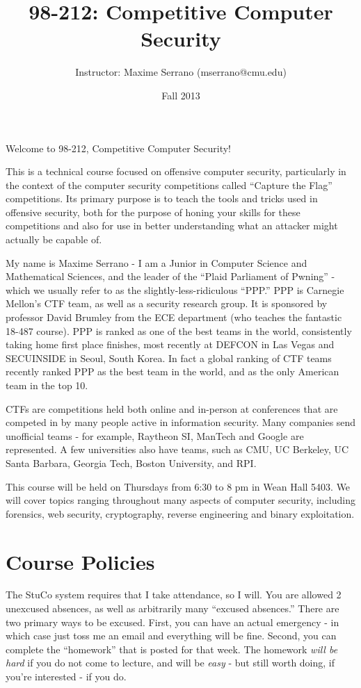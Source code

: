 \documentclass{article}
\title{98-212: Competitive Computer Security}
\date{Fall 2013}
\author{Instructor: Maxime Serrano (mserrano@cmu.edu)}
\begin{document}
\maketitle
Welcome to 98-212, Competitive Computer Security!

This is a technical course focused on offensive computer security, particularly in the context
of the computer security competitions called ``Capture the Flag'' competitions. Its primary purpose
is to teach the tools and tricks used in offensive security, both for the purpose of honing your
skills for these competitions and also for use in better understanding what an attacker might
actually be capable of.

My name is Maxime Serrano - I am a Junior in Computer Science and Mathematical Sciences, and the 
leader of the ``Plaid Parliament of Pwning'' - which we usually refer to as the slightly-less-ridiculous
``PPP.'' PPP is Carnegie Mellon's CTF team, as well as a security research group. It is sponsored by 
professor David Brumley from the ECE department (who teaches the fantastic 18-487 course). PPP is ranked
as one of the best teams in the world, consistently taking home first place finishes, most recently
at DEFCON in Las Vegas and SECUINSIDE in Seoul, South Korea. In fact a global ranking of CTF teams 
recently ranked PPP as the best team in the world, and as the only American team in the top 10.

CTFs are competitions held both online and in-person at conferences that are competed in by many people
active in information security. Many companies send unofficial teams - for example, Raytheon SI, ManTech and
Google are represented. A few universities also have teams, such as CMU, UC Berkeley, UC Santa Barbara,
Georgia Tech, Boston University, and RPI.

This course will be held on Thursdays from 6:30 to 8 pm in Wean Hall 5403. We will cover topics ranging
throughout many aspects of computer security, including forensics, web security, cryptography,
reverse engineering and binary exploitation.

\section{Course Policies}
The StuCo system requires that I take attendance, so I will. You are allowed 2 unexcused absences, as well
as arbitrarily many ``excused absences.'' There are two primary ways to be excused. First, you can have an 
actual emergency - in which case just toss me an email and everything will be fine. Second, you can complete
the ``homework'' that is posted for that week. The homework {\em will be hard} if you do not come to lecture,
and will be {\em easy} - but still worth doing, if you're interested - if you do.
\end{document}
